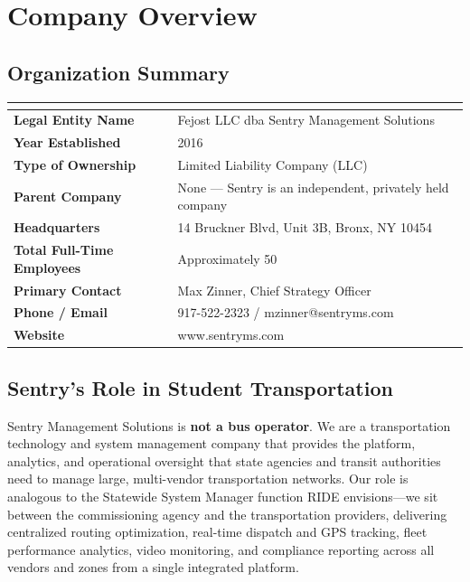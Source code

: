 \section{\texorpdfstring{\color{MidnightBlue}Company Overview}{Company Overview}}

\subsection{Organization Summary}

\begin{tabularx}{\textwidth}{|>{\bfseries}l|X|}
\hline
\rowcolor{tableHeader}\multicolumn{2}{|l|}{\textcolor{white}{\textbf{Organization Summary}}} \\
\hline
Legal Entity Name          & Fejost LLC dba Sentry Management Solutions \\
\hline
Year Established           & 2016 \\
\hline
Type of Ownership          & Limited Liability Company (LLC) \\
\hline
Parent Company             & None --- Sentry is an independent, privately held company \\
\hline
Headquarters               & 14 Bruckner Blvd, Unit 3B, Bronx, NY 10454 \\
\hline
Total Full-Time Employees  & Approximately 50 \\
\hline
Primary Contact            & Max Zinner, Chief Strategy Officer \\
\hline
Phone / Email              & 917-522-2323 / mzinner@sentryms.com \\
\hline
Website                    & www.sentryms.com \\
\hline
\end{tabularx}

\vspace{0.5cm}

\subsection{Sentry's Role in Student Transportation}

Sentry Management Solutions is \textbf{not a bus operator}. We are a transportation technology and system management company that provides the platform, analytics, and operational oversight that state agencies and transit authorities need to manage large, multi-vendor transportation networks. Our role is analogous to the Statewide System Manager function RIDE envisions---we sit between the commissioning agency and the transportation providers, delivering centralized routing optimization, real-time dispatch and GPS tracking, fleet performance analytics, video monitoring, and compliance reporting across all vendors and zones from a single integrated platform.\\


